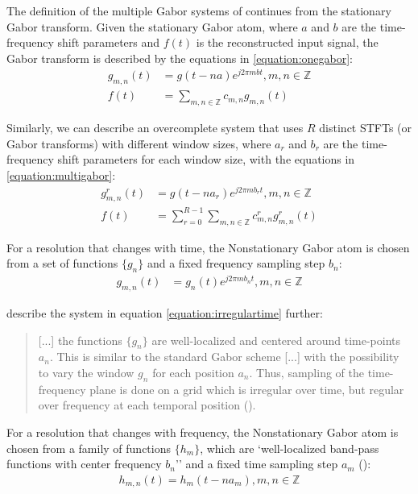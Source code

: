 \documentclass[report.tex]{subfiles}
\begin{document}
The definition of the multiple Gabor systems of \textcite{doerflerphd} continues from the stationary Gabor transform. Given the stationary Gabor atom, where $a$ and $b$ are the time-frequency shift parameters and $f(t)$ is the reconstructed input signal, the Gabor transform is described by the equations in \eqref{equation:onegabor}:
\begin{align}
	\nonumber g_{m,n}(t) &= g(t - na)e^{j2\pi m b t}, m,n \in \mathbb{Z}\\
	\nonumber f(t) &= \sum_{m,n \in \mathbb{Z}}c_{m,n}g_{m,n}(t) \tag{12}\label{equation:onegabor}
\end{align}

Similarly, we can describe an overcomplete system that uses $R$ distinct STFTs (or Gabor transforms) with different window sizes, where $a_{r}$ and $b_{r}$ are the time-frequency shift parameters for each window size, with the equations in \eqref{equation:multigabor}:
\begin{align}
	\nonumber g_{m,n}^{r}(t) &= g(t - na_{r})e^{j2\pi m b_{r} t}, m,n \in \mathbb{Z}\\
	\nonumber f(t) &= \sum_{r=0}^{R-1}\sum_{m,n \in \mathbb{Z}}c^{r}_{m,n}g^{r}_{m,n}(t) \tag{13}\label{equation:multigabor}
\end{align}

For a resolution that changes with time, the Nonstationary Gabor atom is chosen from a set of functions $\{g_{n}\}$ and a fixed frequency sampling step $b_{n}$:
\begin{align}\tag{14}\label{equation:irregulartime}
	g_{m,n}(t) &= g_{n}(t)e^{j2\pi m b_{n}t}, m,n \in \mathbb{Z}
\end{align}

\citeauthor{balazs} describe the system in equation \eqref{equation:irregulartime} further:

\begin{quote}
	[...] the functions $\{g_{n}\}$ are well-localized and centered around time-points $a_{n}$. This is similar to the standard Gabor scheme [...] with the possibility to vary the window $g_{n}$ for each position $a_{n}$. Thus, sampling of the time-frequency plane is done on a grid which is irregular over time, but regular over frequency at each temporal position (\cite[1485]{balazs}).
\end{quote}

For a resolution that changes with frequency, the Nonstationary Gabor atom is chosen from a family of functions $\{h_{m}\}$, which are `well-localized band-pass functions with center frequency $b_{n}$'' and a fixed time sampling step $a_{m}$ (\cite[1486]{balazs}):
\begin{align}\tag{15}\label{equation:irregularfrequency}
	h_{m,n}(t) = h_{m}(t - na_{m}), m,n \in \mathbb{Z}
\end{align}
\end{document}
